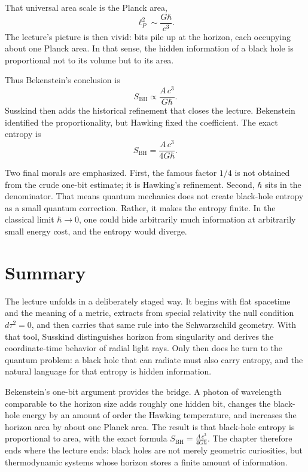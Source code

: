 That universal area scale is the Planck area,
\begin{equation}
\ell_P^2 \sim \frac{G\hbar}{c^3}.
\end{equation}
The lecture's picture is then vivid: bits pile up at the horizon, each occupying about one Planck area. In that sense, the hidden information of a black hole is proportional not to its volume but to its area.

Thus Bekenstein's conclusion is
\begin{equation}
S_{\mathrm{BH}} \propto \frac{A\,c^3}{G\hbar}.
\end{equation}
Susskind then adds the historical refinement that closes the lecture. Bekenstein identified the proportionality, but Hawking fixed the coefficient. The exact entropy is
\begin{equation}
S_{\mathrm{BH}}=\frac{A\,c^3}{4G\hbar}.
\end{equation}

Two final morals are emphasized. First, the famous factor \(1/4\) is not obtained from the crude one-bit estimate; it is Hawking's refinement. Second, \(\hbar\) sits in the denominator. That means quantum mechanics does not create black-hole entropy as a small quantum correction. Rather, it makes the entropy finite. In the classical limit \(\hbar\to 0\), one could hide arbitrarily much information at arbitrarily small energy cost, and the entropy would diverge.

\section{Summary}

The lecture unfolds in a deliberately staged way. It begins with flat spacetime and the meaning of a metric, extracts from special relativity the null condition \(d\tau^2=0\), and then carries that same rule into the Schwarzschild geometry. With that tool, Susskind distinguishes horizon from singularity and derives the coordinate-time behavior of radial light rays. Only then does he turn to the quantum problem: a black hole that can radiate must also carry entropy, and the natural language for that entropy is hidden information.

Bekenstein's one-bit argument provides the bridge. A photon of wavelength comparable to the horizon size adds roughly one hidden bit, changes the black-hole energy by an amount of order the Hawking temperature, and increases the horizon area by about one Planck area. The result is that black-hole entropy is proportional to area, with the exact formula
\(S_{\mathrm{BH}}=\frac{A\,c^3}{4G\hbar}\).
The chapter therefore ends where the lecture ends: black holes are not merely geometric curiosities, but thermodynamic systems whose horizon stores a finite amount of information.